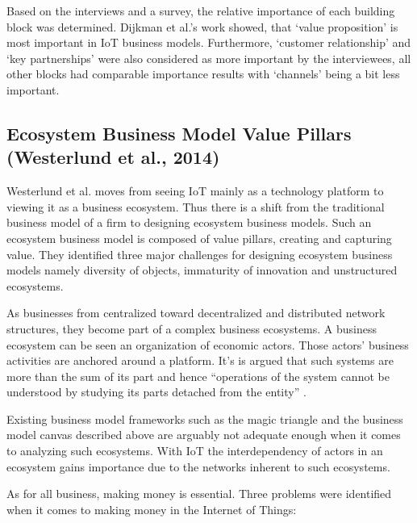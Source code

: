 		Based on the interviews and a survey, the relative importance of each building block was determined. Dijkman et al.'s work showed, that `value proposition' is most important in IoT business models. Furthermore, `customer relationship' and `key  partnerships' were also considered as more important by the interviewees, all other blocks had comparable importance results with  `channels' being a bit less important.\\    
		

	\subsection{Ecosystem Business Model Value Pillars (Westerlund et al., 2014)}
		Westerlund et al. \cite{westerlund} moves from seeing IoT mainly as a technology platform to viewing it as a business ecosystem. Thus there is a shift from the traditional business model of a firm to designing ecosystem business models. Such an ecosystem business model is composed of value pillars, creating and capturing value. They identified three major challenges for designing ecosystem business models namely diversity of objects, immaturity of innovation and unstructured ecosystems.

		As businesses from centralized toward decentralized and distributed network structures, they become part of a complex business ecosystems. A business ecosystem can be seen an organization of economic actors. Those actors' business activities are anchored around a platform. It's is argued that such systems are more than the sum of its part and hence ``operations of the system cannot be understood by studying its parts detached from the entity'' \cite{westerlund}.

		Existing business model frameworks such as the magic triangle and the business model canvas described above are arguably not adequate enough when it comes to analyzing such ecosystems. With IoT the interdependency of actors in an ecosystem gains importance due to the networks inherent to such ecosystems.

		As for all business, making money is essential. Three problems were identified  when it comes to making money in the Internet of Things:

